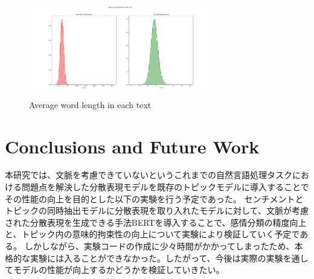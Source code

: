 \documentclass[uplatex]{jsarticle}
\begin{document}
\begin{figure}
    \begin{center}
        \includegraphics[width=8cm]{picture/Average_word_length_in_a_text.png}
    \end{center}
    \caption{Average word length in each text}
\end{figure}

\section{Conclusions and Future Work}
本研究では、文脈を考慮できていないというこれまでの自然言語処理タスクにおける問題点を解決した分散表現モデルを既存のトピックモデルに導入することでその性能の向上を目的とした以下の実験を行う予定であった。
センチメントとトピックの同時抽出モデルに分散表現を取り入れたモデルに対して、文脈が考慮された分散表現を生成できる手法BERTを導入することで、感情分類の精度向上と、トピック内の意味的拘束性の向上について実験により検証していく予定である。
しかしながら、実験コードの作成に少々時間がかかってしまったため、本格的な実験には入ることができなかった。したがって、今後は実際の実験を通してモデルの性能が向上するかどうかを検証していきたい。
\end{document}

